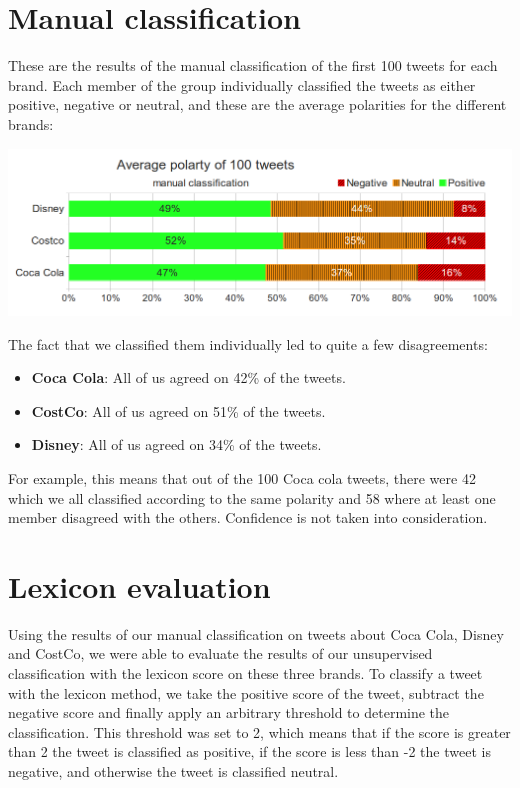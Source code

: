 \documentclass[a4paper,12pt]{report}
\begin{document}
\section{Manual classification}

These are the results of the manual classification of the first 100 tweets for each brand. Each member of the group individually classified the tweets as either positive, negative or neutral, and these are the average polarities for the different brands:

\centerline{\includegraphics[scale=0.55]{../img/man1.png}}

The fact that we classified them individually led to quite a few disagreements:

\begin{itemize}
        \item \textbf{Coca Cola}: All of us agreed on 42\% of the tweets.
        \item \textbf{CostCo}: All of us agreed on 51\% of the tweets.
        \item \textbf{Disney}: All of us agreed on 34\% of the tweets.
\end{itemize}

For example, this means that out of the 100 Coca cola tweets, there were 42 which we all classified according to the same polarity and 58 where at least one member disagreed with the others. Confidence is not taken into consideration.

\section{Lexicon evaluation}

Using the results of our manual classification on tweets about Coca Cola, Disney and CostCo, we were able to evaluate the results of our unsupervised classification with the lexicon score on these three brands.
To classify a tweet with the lexicon method, we take the positive score of the tweet, subtract the negative score and finally apply an arbitrary threshold to determine the classification.
This threshold was set to 2, which means that if the score is greater than 2 the tweet is classified as positive, if the score is less than -2 the tweet is negative, and otherwise the tweet is classified neutral.
\end{document}
